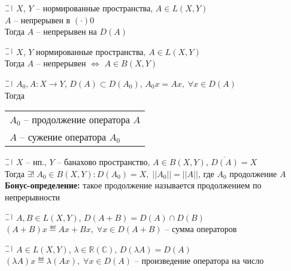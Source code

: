 \begin{lemma}
  $\letus$ $X$, $Y$ -- нормированные пространства,
  $A \in L(X, Y)$ \\
  $A$ -- непрерывен в $(\cdot) 0$ \\
  Тогда $A$ -- непрерывен на $D(A)$
\end{lemma}

\begin{theorem}
  $\letus$ $X$, $Y$ нормированные пространства, $A \in L(X, Y)$\\
  Тогда $A$ -- непрерывен $\Longleftrightarrow$ $A \in B(X, Y)$
\end{theorem}

\begin{definition}
  $\letus$ $A_0, A: X \longrightarrow Y$, $D(A) \subset D(A_0)$, $A_0x=Ax, \; \forall x \in D(A)$\\
  Тогда 
  \begin{tabular}[t]{l}
    $A_0$ -- продолжение оператора $A$\\
    $A$ -- сужение оператора $A_0$
  \end{tabular}
\end{definition}

\begin{theorem}
  $\letus$ $X$ -- нп., $Y$ -- банахово пространство, $A \in B(X, Y)$, $\overline{D(A)} = X$\\
  Тогда $\exists! \; A_0 \in B(X, Y): D(A_0) = X, \; ||A_0|| = ||A||$, где $A_0$ продолжение $A$\\
  {\bf Бонус-определение:} такое продолжение называется продолжением по непрерывности
\end{theorem}

\begin{definition}
  $\letus$ $A, B \in L(X, Y)$, $D(A + B) = D(A) \cap D(B)$\\
  $(A+B)x \eqdef Ax + Bx, \; \forall x \in D(A+B)$ -- сумма операторов 
\end{definition}

\begin{definition}
  $\letus$ $A \in L(X, Y)$, $\lambda \in \mathbb{R}(\mathbb{C})$, $D(\lambda A) = D(A)$\\
  $(\lambda A)x \eqdef \lambda(Ax), \; \forall x \in D(A)$ -- произведение оператора на число 
\end{definition}

